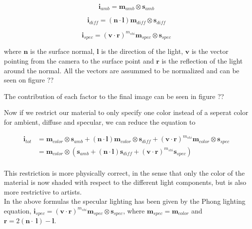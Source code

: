 \begin{displaymath}
  \mathbf{i}_{amb} = \mathbf{m}_{amb} \otimes \mathbf{s}_{amb} 
\end{displaymath}

\begin{displaymath}
  \mathbf{i}_{diff} = (\mathbf{n} \cdot \mathbf{l}) \mathbf{m}_{diff} \otimes \mathbf{s}_{diff} 
\end{displaymath}

\begin{displaymath}
  \mathbf{i}_{spec} = (\mathbf{v} \cdot \mathbf{r})^{m_{shi}} \mathbf{m}_{spec} \otimes \mathbf{s}_{spec} 
\end{displaymath}

where $\mathbf{n}$ is the surface normal, $\mathbf{l}$ is the
direction of the light, $\mathbf{v}$ is the vector pointing from the
camera to the surface point and $\mathbf{r}$ is the reflection of the
light around the normal. All the vectors are assummed to be normalized
and can be seen on figure ??


The contribution of each factor to the final image can be seen in figure ??

Now if we restrict our material to only specify one color instead of a
seperat color for ambient, diffuse and specular, we can reduce the
equation to 

\begin{displaymath}
  \begin{array}{rl}
    \mathbf{i}_{tot} &= \mathbf{m}_{color} \otimes \mathbf{s}_{amb} + (\mathbf{n} \cdot
    \mathbf{l}) \mathbf{m}_{color} \otimes \mathbf{s}_{diff} +
    (\mathbf{v} \cdot \mathbf{r})^{m_{shi}} \mathbf{m}_{color} \otimes
    \mathbf{s}_{spec} \\
    &= \mathbf{m}_{color} \otimes (\mathbf{s}_{amb} + (\mathbf{n} \cdot
    \mathbf{l}) \mathbf{s}_{diff} + (\mathbf{v} \cdot
    \mathbf{r})^{m_{shi}} \mathbf{s}_{spec}) \\
  \end{array}
\end{displaymath}

This restriction is more physically correct, in the sense that only
the color of the material is now shaded with respect to the different
light components, but is also more restrictive to artists.\\

In the above formulas the specular lighting has been given by the
Phong lighting equation, $\mathbf{i}_{spec} = (\mathbf{v} \cdot
\mathbf{r})^{m_{shi}} \mathbf{m}_{spec} \otimes \mathbf{s}_{spec}$,
where $\mathbf{m}_{spec} = \mathbf{m}_{color}$ and $\mathbf{r} = 2
(\mathbf{n} \cdot \ \mathbf{l}) - \mathbf{l}$.

